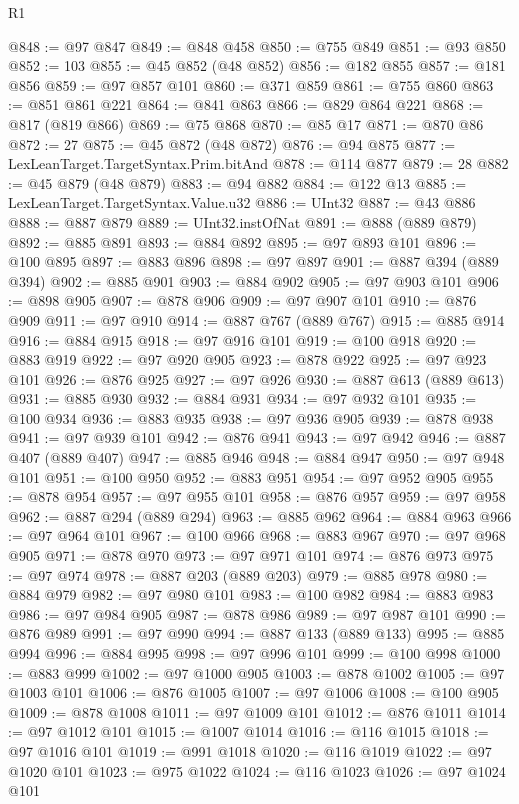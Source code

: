 \begin{lexlean}{R1}
\begin{coremodule}
@848 := @97 @847
@849 := @848 @458
@850 := @755 @849
@851 := @93 @850
@852 := 103
@855 := @45 @852 (@48 @852)
@856 := @182 @855
@857 := @181 @856
@859 := @97 @857 @101
@860 := @371 @859
@861 := @755 @860
@863 := @851 @861 @221
@864 := @841 @863
@866 := @829 @864 @221
@868 := @817 (@819 @866)
@869 := @75 @868
@870 := @85 @17
@871 := @870 @86
@872 := 27
@875 := @45 @872 (@48 @872)
@876 := @94 @875
@877 := LexLeanTarget.TargetSyntax.Prim.bitAnd
@878 := @114 @877
@879 := 28
@882 := @45 @879 (@48 @879)
@883 := @94 @882
@884 := @122 @13
@885 := LexLeanTarget.TargetSyntax.Value.u32
@886 := UInt32
@887 := @43 @886
@888 := @887 @879
@889 := UInt32.instOfNat
@891 := @888 (@889 @879)
@892 := @885 @891
@893 := @884 @892
@895 := @97 @893 @101
@896 := @100 @895
@897 := @883 @896
@898 := @97 @897
@901 := @887 @394 (@889 @394)
@902 := @885 @901
@903 := @884 @902
@905 := @97 @903 @101
@906 := @898 @905
@907 := @878 @906
@909 := @97 @907 @101
@910 := @876 @909
@911 := @97 @910
@914 := @887 @767 (@889 @767)
@915 := @885 @914
@916 := @884 @915
@918 := @97 @916 @101
@919 := @100 @918
@920 := @883 @919
@922 := @97 @920 @905
@923 := @878 @922
@925 := @97 @923 @101
@926 := @876 @925
@927 := @97 @926
@930 := @887 @613 (@889 @613)
@931 := @885 @930
@932 := @884 @931
@934 := @97 @932 @101
@935 := @100 @934
@936 := @883 @935
@938 := @97 @936 @905
@939 := @878 @938
@941 := @97 @939 @101
@942 := @876 @941
@943 := @97 @942
@946 := @887 @407 (@889 @407)
@947 := @885 @946
@948 := @884 @947
@950 := @97 @948 @101
@951 := @100 @950
@952 := @883 @951
@954 := @97 @952 @905
@955 := @878 @954
@957 := @97 @955 @101
@958 := @876 @957
@959 := @97 @958
@962 := @887 @294 (@889 @294)
@963 := @885 @962
@964 := @884 @963
@966 := @97 @964 @101
@967 := @100 @966
@968 := @883 @967
@970 := @97 @968 @905
@971 := @878 @970
@973 := @97 @971 @101
@974 := @876 @973
@975 := @97 @974
@978 := @887 @203 (@889 @203)
@979 := @885 @978
@980 := @884 @979
@982 := @97 @980 @101
@983 := @100 @982
@984 := @883 @983
@986 := @97 @984 @905
@987 := @878 @986
@989 := @97 @987 @101
@990 := @876 @989
@991 := @97 @990
@994 := @887 @133 (@889 @133)
@995 := @885 @994
@996 := @884 @995
@998 := @97 @996 @101
@999 := @100 @998
@1000 := @883 @999
@1002 := @97 @1000 @905
@1003 := @878 @1002
@1005 := @97 @1003 @101
@1006 := @876 @1005
@1007 := @97 @1006
@1008 := @100 @905
@1009 := @878 @1008
@1011 := @97 @1009 @101
@1012 := @876 @1011
@1014 := @97 @1012 @101
@1015 := @1007 @1014
@1016 := @116 @1015
@1018 := @97 @1016 @101
@1019 := @991 @1018
@1020 := @116 @1019
@1022 := @97 @1020 @101
@1023 := @975 @1022
@1024 := @116 @1023
@1026 := @97 @1024 @101

\end{coremodule}
\end{lexlean}
